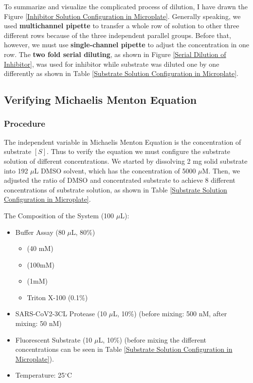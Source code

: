 \documentclass{report}
\begin{document}
To summarize and visualize the complicated process of dilution, I have drawn the Figure \ref{Inhibitor Solution Configuration in Microplate}.
Generally speaking, we used \textbf{multichannel pipette} to transfer a whole row of solution to other three different rows because of the three independent parallel groups.
Before that, however, we must use \textbf{single-channel pipette} to adjust the concentration in one row.
The \textbf{two fold serial diluting}, as shown in Figure \ref{Serial Dilution of Inhibitor}, was used for inhibitor while substrate was diluted one by one differently as shown in Table \ref{Substrate Solution Configuration in Microplate}.

\subsection{Verifying Michaelis Menton Equation}
\subsubsection{Procedure}

The independent variable in Michaelis Menton Equation is the concentration of substrate $[S]$.
Thus to verify the equation we must configure the substrate solution of different concentrations.
We started by dissolving 2 mg solid substrate into 192 $\mu$L DMSO solvent, which has the concentration of 5000 $\mu$M.
Then, we adjusted the ratio of DMSO and concentrated substrate to achieve 8 different concentrations of substrate solution, as shown in Table \ref{Substrate Solution Configuration in Microplate}.

The Composition of the System (100 $\mu$L):
\begin{itemize}
    \item Buffer Assay (80 $\mu$L, 80\%)
    \begin{itemize}
        \item {} (40 mM)
        \item {} (100mM)
        \item {} (1mM)
        \item Triton X-100 (0.1\%)
    \end{itemize}
    \item SARS-CoV2-3CL Protease (10 $\mu$L, 10\%) (before mixing: 500 nM, after mixing: 50 nM)
    \item Fluorescent Substrate (10 $\mu$L, 10\%) (before mixing the different concentrations can be seen in Table \ref{Substrate Solution Configuration in Microplate}).
    \item Temperature: 25$^\circ$C
\end{itemize}
\end{document}
